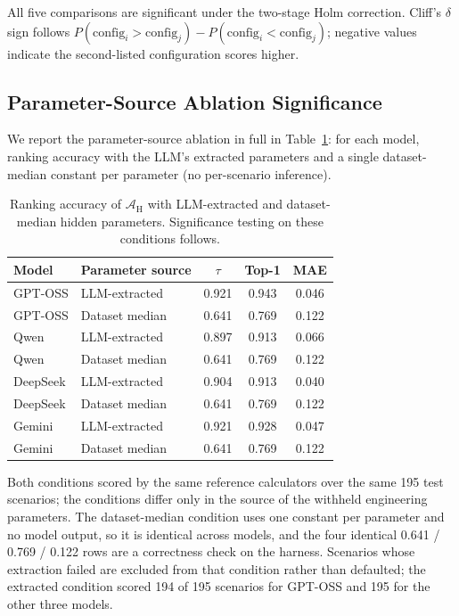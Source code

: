 \documentclass[11pt]{article}
\begin{document}
All five comparisons are significant under the two-stage Holm correction. Cliff's $\delta$ sign follows $P(\text{config}_i > \text{config}_j) - P(\text{config}_i < \text{config}_j)$; negative values indicate the second-listed configuration scores higher.

\subsection{Parameter-Source Ablation Significance}
\label{app:paramprov-significance}

We report the parameter-source ablation in full in Table~\ref{tab:param_provenance}: for each model, ranking accuracy with the LLM's extracted parameters and a single dataset-median constant per parameter (no per-scenario inference).

\begin{table}[htbp]
\centering
\footnotesize
\centering
\caption{Ranking accuracy of $\mathcal{A}_{\text{H}}$ with LLM-extracted and dataset-median hidden parameters. Significance testing on these conditions follows.}
\label{tab:param_provenance}
\renewcommand{\arraystretch}{1.15}
\begin{tabular}{llccc}
\toprule
Model & Parameter source & $\tau$ & Top-1 & MAE \\
\midrule
GPT-OSS & LLM-extracted & 0.921 & 0.943 & 0.046 \\
GPT-OSS & Dataset median & 0.641 & 0.769 & 0.122 \\
\midrule
Qwen & LLM-extracted & 0.897 & 0.913 & 0.066 \\
Qwen & Dataset median & 0.641 & 0.769 & 0.122 \\
\midrule
DeepSeek & LLM-extracted & 0.904 & 0.913 & 0.040 \\
DeepSeek & Dataset median & 0.641 & 0.769 & 0.122 \\
\midrule
Gemini & LLM-extracted & 0.921 & 0.928 & 0.047 \\
Gemini & Dataset median & 0.641 & 0.769 & 0.122 \\
\bottomrule
\end{tabular}
\renewcommand{\arraystretch}{1.0}
\end{table}

Both conditions scored by the same reference calculators over the same 195 test scenarios; the conditions differ only in the source of the withheld engineering parameters. The dataset-median condition uses one constant per parameter and no model output, so it is identical across models, and the four identical 0.641 / 0.769 / 0.122 rows are a correctness check on the harness. Scenarios whose extraction failed are excluded from that condition rather than defaulted; the extracted condition scored 194 of 195 scenarios for GPT-OSS and 195 for the other three models.
\end{document}
